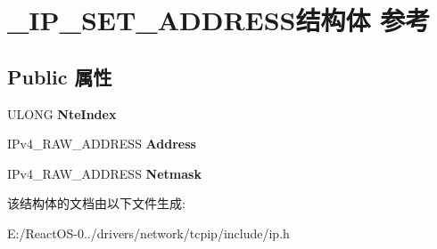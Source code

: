 \hypertarget{struct___i_p___s_e_t___a_d_d_r_e_s_s}{}\section{\+\_\+\+I\+P\+\_\+\+S\+E\+T\+\_\+\+A\+D\+D\+R\+E\+S\+S结构体 参考}
\label{struct___i_p___s_e_t___a_d_d_r_e_s_s}
\subsection*{Public 属性}
\begin{DoxyCompactItemize}
\item 
\mbox{\label{struct___i_p___s_e_t___a_d_d_r_e_s_s_a5d817fbaa838b6e060f25d91a6936541}} 
U\+L\+O\+NG {\bfseries Nte\+Index}
\item 
\mbox{\label{struct___i_p___s_e_t___a_d_d_r_e_s_s_a852f43ea5bee6f25a72eec1e3863f2be}} 
I\+Pv4\+\_\+\+R\+A\+W\+\_\+\+A\+D\+D\+R\+E\+SS {\bfseries Address}
\item 
\mbox{\label{struct___i_p___s_e_t___a_d_d_r_e_s_s_ac08cbc9b97e64fbf7aae87ef3935f9fc}} 
I\+Pv4\+\_\+\+R\+A\+W\+\_\+\+A\+D\+D\+R\+E\+SS {\bfseries Netmask}
\end{DoxyCompactItemize}


该结构体的文档由以下文件生成\+:\begin{DoxyCompactItemize}
\item 
E\+:/\+React\+O\+S-\/0../drivers/network/tcpip/include/ip.\+h\end{DoxyCompactItemize}
